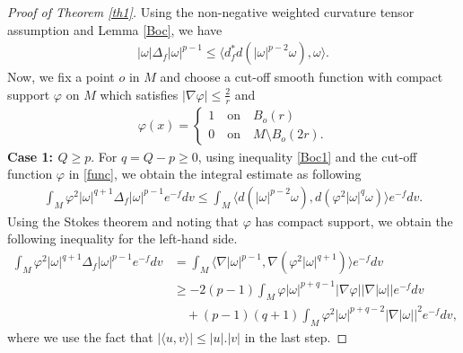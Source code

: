\documentclass[10pt,a4paper]{amsart}
\numberwithin{equation}{section}
\begin{document}
\begin{proof}[Proof of Theorem \ref{th1}]
	Using the non-negative weighted curvature tensor assumption and Lemma \ref{Boc}, we have
	\begin{align}\label{Boc1}
			|\omega| \Delta_f |\omega|^{p-1} \le  \langle d^*_f d (|\omega|^{p-2}\omega), \omega \rangle.
	\end{align}
	Now, we fix a point $o$ in $M$ and choose a cut-off smooth function with compact support $\varphi$ on $M$ which satisfies $|\nabla \varphi|\le \frac{2}{r}$ and
\begin{align}\label{func}
		\varphi(x)= \begin{cases}
		1 \quad \text{on} \quad B_o(r)\\
		0 \quad \text{on} \quad M\setminus B_o(2r).
	\end{cases}
\end{align}	
\textbf{Case 1: $Q \ge p$}.  For $q=Q-p\ge 0$,	using inequality \eqref{Boc1} and the cut-off function $\varphi$ in \eqref{func}, we obtain the integral estimate as following
	\begin{align} \label{c11}
		\int_M \varphi ^2|\omega |^{q+1} \Delta_f |\omega |^{p-1}e^{-f} dv \le 
		\int_M \langle d(|\omega|^{p-2}\omega),d(\varphi^2 |\omega|^q\omega) \rangle e^{-f}dv.		
	\end{align}
Using the Stokes theorem and noting that $\varphi$ has compact support, we obtain the following inequality for the left-hand side.
\begin{align}\label{del1}  \nonumber
	\int_M {{\varphi ^2}|\omega |^{q+1}\Delta_f |\omega |^{p-1}} e^{-f}dv 
	&=\int_M \langle \nabla |\omega|^{p-1}, \nabla ( \varphi^2 |\omega|^{q+1}) \rangle e^{-f}dv \nonumber \\ 
		&\ge  -2(p-1)\int_M {\varphi |\omega |^{p+q-1}  | \nabla \varphi| |\nabla |\omega | | } e^{-f}dv\nonumber \\& \quad+ 
	(p-1)(q+1) \int_M {{\varphi ^2}|\omega|^{p+q-2} |\nabla |\omega |{|^2}}e^{-f}dv,
\end{align}	
where we use the fact that $|\langle u, v \rangle |\le |u|.|v|$ in the last step.


\end{proof}
\end{document}
